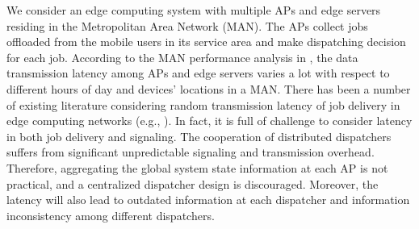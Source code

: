 We consider an edge computing system with multiple APs and edge servers residing in the Metropolitan Area Network (MAN).
The APs collect jobs offloaded from the mobile users in its service area and make dispatching decision for each job. According to the MAN performance analysis in \cite{MAN-LATENCY}, the data transmission latency {among APs and edge servers} varies a lot with respect to different hours of day and devices' locations in a MAN. 
There has been a number of existing literature considering random transmission latency of job delivery in edge computing networks (e.g., \cite{latency-EDGE19,MOBIHOC19-ZhouZ,IOTJ18-FanQ,TOC19-LiuC,JSAC19-AlameddineHA}). 
In fact, it is full of challenge to consider latency in {both job delivery and} signaling. The cooperation of distributed dispatchers suffers from significant unpredictable signaling and transmission overhead. Therefore, aggregating the global system state information at each AP is not practical, and a centralized dispatcher design is discouraged. Moreover, the latency will also lead to outdated information at each dispatcher and information inconsistency among different dispatchers.



